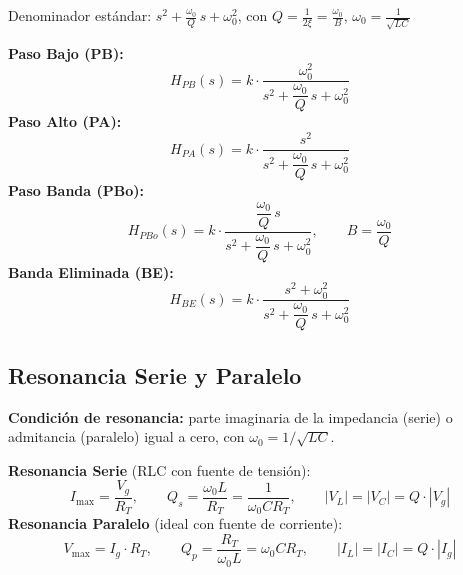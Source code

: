 \documentclass[12pt,a4paper]{article}
\begin{document}
Denominador estándar:
$\displaystyle s^2 + \frac{\omega_0}{Q}\,s + \omega_0^2$,\quad
con $\displaystyle Q = \frac{1}{2\xi} = \frac{\omega_0}{B}$,\quad
$\displaystyle\omega_0 = \frac{1}{\sqrt{LC}}$

\begin{formulabox}
\textbf{Paso Bajo (PB):}
\[
  H_{PB}(s) = k\cdot
  \frac{\omega_0^2}{s^2 + \dfrac{\omega_0}{Q}\,s + \omega_0^2}
\]
\textbf{Paso Alto (PA):}
\[
  H_{PA}(s) = k\cdot
  \frac{s^2}{s^2 + \dfrac{\omega_0}{Q}\,s + \omega_0^2}
\]
\textbf{Paso Banda (PBo):}
\[
  H_{PBo}(s) = k\cdot
  \frac{\dfrac{\omega_0}{Q}\,s}{s^2 + \dfrac{\omega_0}{Q}\,s + \omega_0^2},
  \qquad B = \frac{\omega_0}{Q}
\]
\textbf{Banda Eliminada (BE):}
\[
  H_{BE}(s) = k\cdot
  \frac{s^2 + \omega_0^2}{s^2 + \dfrac{\omega_0}{Q}\,s + \omega_0^2}
\]
\end{formulabox}

\subsection{Resonancia Serie y Paralelo}

\textbf{Condición de resonancia:} parte imaginaria de la impedancia (serie) o
admitancia (paralelo) igual a cero, con $\omega_0 = 1/\!\sqrt{LC}$.

\begin{formulabox}
\textbf{Resonancia Serie} (RLC con fuente de tensión):
\[
  I_{\max} = \frac{V_g}{R_T},\qquad
  Q_s = \frac{\omega_0 L}{R_T} = \frac{1}{\omega_0 C R_T},\qquad
  |V_L| = |V_C| = Q\cdot|V_g|
\]
\textbf{Resonancia Paralelo} (ideal con fuente de corriente):
\[
  V_{\max} = I_g\cdot R_T,\qquad
  Q_p = \frac{R_T}{\omega_0 L} = \omega_0 C R_T,\qquad
  |I_L| = |I_C| = Q\cdot|I_g|
\]
\end{formulabox}
\end{document}
